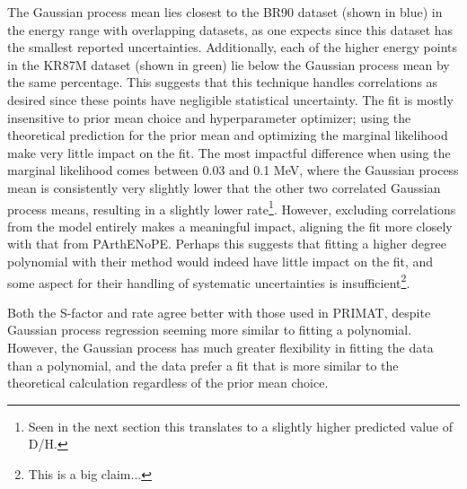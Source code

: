 \documentclass[%
 reprint,
superscriptaddress,
nofootinbib,
 amsmath,amssymb,
 aps,
 pra,
]{revtex4-2}
\begin{document}
The Gaussian process mean lies closest to the BR90 dataset (shown in blue) in the energy range with overlapping datasets, as one expects since this dataset has the smallest reported uncertainties. Additionally, each of the higher energy points in the KR87M dataset (shown in green) lie below the Gaussian process mean by the same percentage. This suggests that this technique handles correlations as desired since these points have negligible statistical uncertainty. The fit is mostly insensitive to prior mean choice and hyperparameter optimizer; using the theoretical prediction for the prior mean and optimizing the marginal likelihood make very little impact on the fit. The most impactful difference when using the marginal likelihood comes between 0.03 and 0.1 MeV, where the Gaussian process mean is consistently very slightly lower that the other two correlated Gaussian process means, resulting in a slightly lower rate\footnote{Seen in the next section this translates to a slightly higher predicted value of D/H.}. However, excluding correlations from the model entirely makes a meaningful impact, aligning the fit more closely with that from PArthENoPE. Perhaps this suggests that fitting a higher degree polynomial with their method would indeed have little impact on the fit, and some aspect for their handling of systematic uncertainties is insufficient\footnote{This is a big claim...}. 

Both the S-factor and rate agree better with those used in PRIMAT, despite Gaussian process regression seeming more similar to fitting a polynomial. However, the Gaussian process has much greater flexibility in fitting the data than a polynomial, and the data prefer a fit that is more similar to the theoretical calculation regardless of the prior mean choice. 
\end{document}
